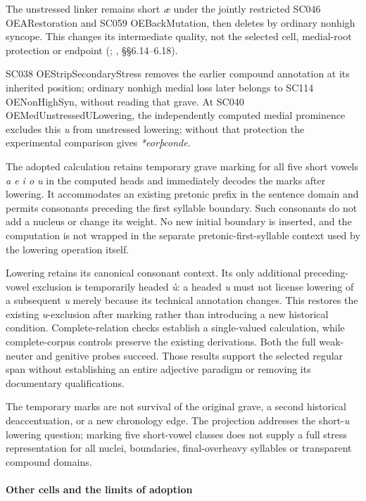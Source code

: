 \documentclass[
  british,
  a4paper,
]{article}
\begin{document}
The unstressed linker remains short \emph{æ} under the jointly
restricted SC046 OEARestoration and SC059 OEBackMutation, then deletes
by ordinary nonhigh syncope. This changes its intermediate quality, not
the selected cell, medial-root protection or endpoint
(;
, §§6.14--6.18).

SC038 OEStripSecondaryStress removes the earlier compound annotation at
its inherited position; ordinary nonhigh medial loss later belongs to
SC114 OENonHighSyn, without reading that grave. At SC040
OEMedUnstressedULowering, the independently computed medial prominence
excludes this \emph{u} from unstressed lowering; without that protection
the experimental comparison gives \emph{*eorþconde}.

The adopted calculation retains temporary grave marking for all five
short vowels \emph{a e i o u} in the computed heads and immediately
decodes the marks after lowering. It accommodates an existing pretonic
prefix in the sentence domain and permits consonants preceding the first
syllable boundary. Such consonants do not add a nucleus or change its
weight. No new initial boundary is inserted, and the computation is not
wrapped in the separate pretonic-first-syllable context used by the
lowering operation itself.

Lowering retains its canonical consonant context. Its only additional
preceding-vowel exclusion is temporarily headed \emph{ù}: a headed
\emph{u} must not license lowering of a subsequent \emph{u} merely
because its technical annotation changes. This restores the existing
\emph{u}-exclusion after marking rather than introducing a new
historical condition. Complete-relation checks establish a single-valued
calculation, while complete-corpus controls preserve the existing
derivations. Both the full weak-neuter and genitive probes succeed.
Those results support the selected regular span without establishing an
entire adjective paradigm or removing its documentary qualifications.

The temporary marks are not survival of the original grave, a second
historical deaccentuation, or a new chronology edge. The projection
addresses the short-\emph{u} lowering question; marking five short-vowel
classes does not supply a full stress representation for all nuclei,
boundaries, final-overheavy syllables or transparent compound domains.

\paragraph{Other cells and the limits of
adoption}\label{other-cells-and-the-limits-of-adoption}
\end{document}
